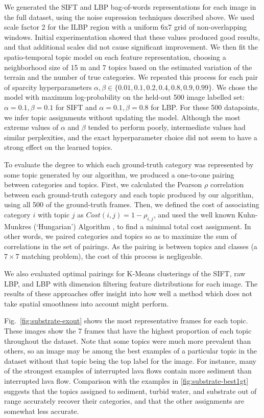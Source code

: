 We generated the SIFT and LBP bag-of-words representations for each image in the full dataset, using the noise supression techniques described above. We used scale factor 2 for the ILBP region with a uniform 6x7 grid of non-overlapping windows. Initial experimentation showed that these values produced good results, and that additional scales did not cause significant improvement. We then fit the spatio-temporal topic model on each feature representation, choosing a neighborhood size of 15 m and 7 topics based on the estimated variation of the terrain and the number of true categories. We repeated this process for each pair of sparcity hyperparameters $\alpha, \beta \in \{0.01, 0.1, 0.2, 0.4, 0.8, 0.9, 0.99\}$. We chose the model with maximum log-probability on the held-out 500 image labelled set: $\alpha = 0.1, \beta = 0.1$ for SIFT and $\alpha = 0.1, \beta = 0.8$ for LBP. For these 500 datapoints, we infer topic assignments without updating the model. Although the most extreme values of $\alpha$ and $\beta$ tended to perform poorly, intermediate values had similar perplexities, and the exact hyperparameter choice did not seem to have a strong effect on the learned topics. 

To evaluate the degree to which each ground-truth category was represented by some topic generated by our algorithm, we produced a one-to-one pairing between categories and topics. First, we calculated the Pearson $\rho$ correlation between each ground-truth category and each topic produced by our algorithm, using all 500 of the ground-truth frames. Then, we defined the cost of associating category $i$ with topic $j$ as $Cost(i, j) = 1 - \rho_{i,j}$, and used the well known Kuhn-Munkres (`Hungarian') Algorithm \citep{KuhnHungarian}, to find a minimal total cost assignment. In other words, we paired categories and topics so as to maximize the sum of correlations in the set of pairings. As the pairing is between topics and classes (a $7\times7$ matching problem), the cost of this process is negligeable.

We also evaluated optimal pairings for K-Means clusterings of the SIFT, raw LBP, and LBP with dimension filtering feature distributions for each image. The results of these approaches offer insight into how well a method which does not take spatial smoothness into account might perform.

Fig.~\ref{fig:substrate-exout} shows the most representative frames for each topic. These images show the 7 frames that have the highest proportion of each topic throughout the dataset. Note that some topics were much more prevalent than others, so
an image may be among the best examples of a particular topic in the dataset without that topic being the top label for
the image. For instance, many of the strongest examples of interrupted lava flows contain more sediment than interrupted
lava flow. Comparison with the examples in \ref{fig:substrate-best1gt} suggests that the topics assigned
to sediment, turbid water, and substrate out of range accurately recover their categories, and that the
other assignments are somewhat less accurate.


